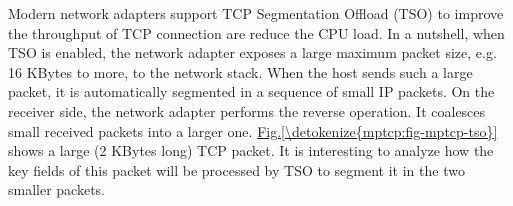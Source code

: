 \documentclass[letterpaper,10pt,english]{sphinxmanual}
\begin{document}
\sphinxAtStartPar
Modern network adapters support TCP Segmentation Offload (TSO) to improve the throughput of TCP connection are reduce the CPU load. In a nutshell, when TSO is enabled, the network adapter exposes a large maximum packet size, e.g. 16 KBytes to more, to the network stack. When the host sends such a large packet, it is automatically segmented in a sequence of small IP packets. On the receiver side, the network adapter performs the reverse operation. It coalesces small received packets into a larger one. \hyperref[\detokenize{mptcp:fig-mptcp-tso}]{Fig.\@ \ref{\detokenize{mptcp:fig-mptcp-tso}}} shows a large (2 KBytes long) TCP packet. It is interesting to analyze how the key fields of this packet will be processed by TSO to segment it in the two smaller packets.
\begin{figure}[htbp]\centering\capstart{}
\end{figure}
\end{document}
